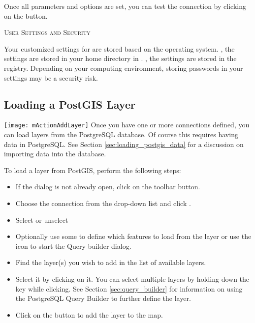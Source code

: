 Once all parameters and options are set, you can test the connection by
clicking on the  button.

\begin{Tip}\caption{\textsc{\qg User Settings and
Security}}
Your customized settings for \qg are stored based on the operating
system. \nix, the settings are stored in your home directory in
. \win, the settings are stored in the registry. Depending on
your computing environment, storing passwords in your \qg settings may be a
security risk.
\end{Tip}

\subsection{Loading a PostGIS Layer}

\texttt{[image: mActionAddLayer]} Once you have one or more
connections defined, you can load layers from the PostgreSQL database. Of
course this requires having data in PostgreSQL. See Section
\ref{sec:loading_postgis_data} for a discussion on importing data into the
database.

To load a layer from PostGIS, perform the following steps:

\begin{itemize}[label=--]
\item If the  dialog is not already open, click on the
 toolbar button.
\item Choose the connection from the drop-down list and click .
\item Select or unselect 
\item Optionally use some  to define which features
to load from the layer or use the  icon to start the 
Query builder dialog.
\item Find the layer(s) you wish to add in the list of available layers.
\item Select it by clicking on it. You can select multiple layers by holding
down the  key while clicking. See Section \ref{sec:query_builder} for
information on using the PostgreSQL Query Builder to further define the layer.
\item Click on the  button to add the layer to the map.
\end{itemize}

